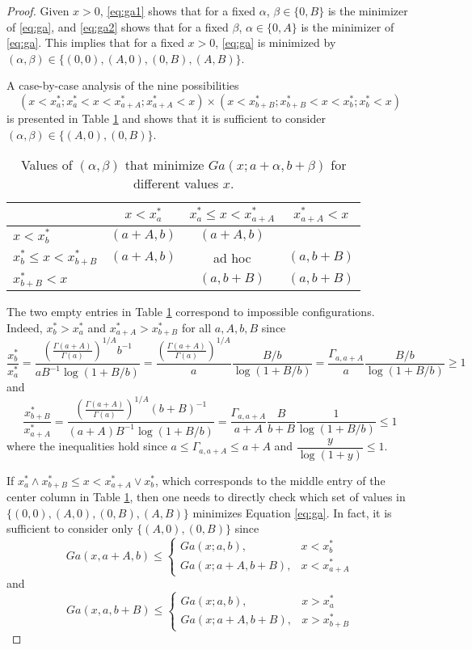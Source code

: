 \documentclass[11pt]{article}
\begin{document}
\begin{proof}
	Given $x>0$, \ref{eq:ga1} shows that for a fixed $\alpha$, $\beta \in \{0, B\}$ is the minimizer of \ref{eq:ga}, and \ref{eq:ga2} shows that for a fixed $\beta$, $\alpha \in \{0, A\}$ is the minimizer of \ref{eq:ga}. This implies that for a fixed $x>0$, \ref{eq:ga} is minimized by $(\alpha, \beta) \in \{(0,0), (A, 0), (0, B), (A,B)\}$.
	
	A case-by-case analysis of the nine possibilities
	$$(x<x_a^*; x_a^*<x<x_{a+A}^*; x_{a+A}^* < x )\times(x<x_{b+B}^*; x_{b+B}^*<x<x_b^*; x_b^* < x)$$
	is presented in Table \ref{tab:ga9} and shows that it is sufficient to consider $(\alpha, \beta) \in \{(A, 0), (0, B)\}$.
	
	\begin{table}[H]
		\centering
		\begin{tabular}{l|c c c}
			& $x<x_a^*$  & $x_a^*\le x<x_{a+A}^*$ & $x_{a+A}^* < x$ \\ \hline
			$x<x_b^*$              & $(a+A, b)$ & $(a+A, b)$             &                 \\
			$x_b^*\le x<x_{b+B}^*$ & $(a+A, b)$ &  ad hoc                & $(a, b+B)$      \\
			$x_{b+B}^* < x$        &            & $(a, b+B)$             & $(a, b+B)$
		\end{tabular}
		\caption{Values of $(\alpha, \beta)$ that minimize $Ga(x;a+\alpha,b+\beta)$ for different values $x$.}
		\label{tab:ga9}
	\end{table}
	
	The two empty entries in Table \ref{tab:ga9} correspond to impossible configurations. Indeed, $x_b^* > x_a^*$ and $x_{a+A}^* > x_{b+B}^*$ for all $a, A, b, B$ since
	$$
	\frac{x_b^*}{x_a^*} = \dfrac{\left(\frac{\Gamma(a+A)}{\Gamma(a)}\right)^{1/A} b^{-1} }{a B^{-1} \log\left( 1+B/b\right)} = \dfrac{\left(\frac{\Gamma(a+A)}{\Gamma(a)}\right)^{1/A}}{a} \dfrac{B/b}{\log\left( 1+B/b\right)} = \dfrac{\Gamma_{a,a+A}}{a} \dfrac{B/b}{\log\left( 1+B/b\right)} \ge 1
	$$
	and
	$$
	\frac{x_{b+B}^*}{x_{a+A}^*} = \dfrac{\left(\frac{\Gamma(a+A)}{\Gamma(a)}\right)^{1/A} (b+B)^{-1} }{(a+A) B^{-1} \log\left( 1+B/b\right)} = \dfrac{\Gamma_{a,a+A}}{a+A} \dfrac{B}{b+B} \dfrac{1}{\log\left( 1+B/b\right)} \le 1
	$$
	where the inequalities hold since $a \le \Gamma_{a,a+A} \le a+A$ and $\dfrac{y}{\log\left( 1+y\right)}\le1$.
		
	If $x_a^* \wedge x_{b+B}^*\le x < x_{a+A}^* \vee x_{b}^*$, which corresponds to the middle entry of the center column in Table \ref{tab:ga9}, then one needs to directly check which set of values in $\{(0,0), (A, 0), (0, B), (A,B)\}$ minimizes Equation \ref{eq:ga}. In fact, it is sufficient to consider only $\{(A,0), (0, B)\}$ since
	$$Ga(x, a+A, b) \le \begin{cases}
		Ga(x;a,b), & x < x_b^* \\
		Ga(x;a+A,b+B), & x < x_{a+A}^* 
	\end{cases}$$
	and
	$$Ga(x, a, b+B) \le \begin{cases}
		Ga(x;a,b), & x > x_a^* \\
		Ga(x;a+A,b+B), & x > x_{b+B}^* 
	\end{cases}$$
\end{proof}
\end{document}
